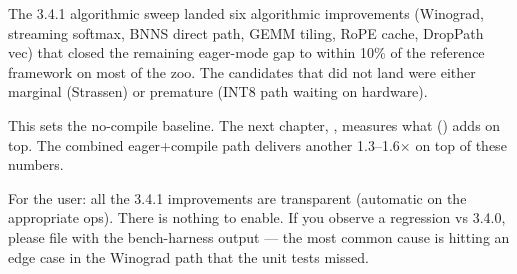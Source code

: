 The 3.4.1 algorithmic sweep landed six algorithmic improvements
(Winograd, streaming softmax, BNNS direct path, GEMM tiling,
RoPE cache, DropPath vec) that closed the remaining eager-mode
gap to within 10\% of the reference framework on most of the
zoo. The candidates that did not land were either marginal
(Strassen) or premature (INT8 path waiting on hardware).

This sets the no-compile baseline. The next chapter,
, measures what
 () adds on top.
The combined eager+compile path delivers another 1.3--1.6$\times$
on top of these numbers.

\begin{lucidnote}
For the user: all the 3.4.1 improvements are transparent
(automatic on the appropriate ops). There is nothing to enable.
If you observe a regression vs 3.4.0, please file with the
bench-harness output --- the most common cause is hitting an
edge case in the Winograd path that the unit tests missed.
\end{lucidnote}
